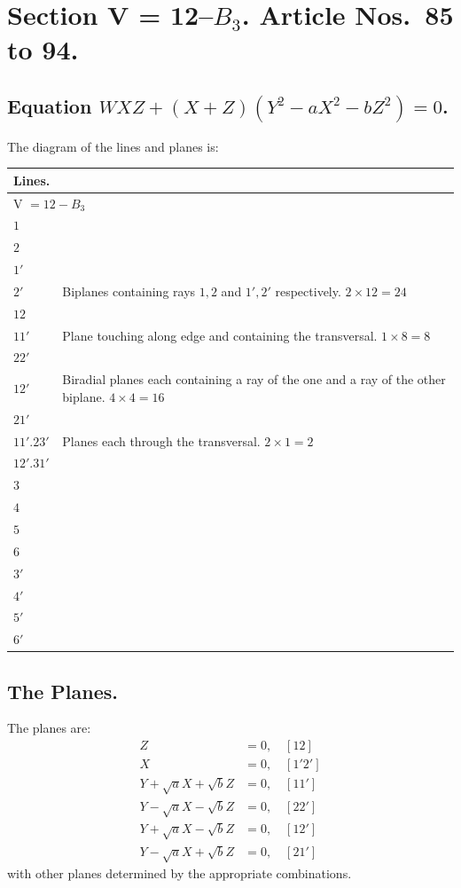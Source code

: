 \documentclass[11pt,a4paper]{article}
\begin{document}
\section*{Section V = 12--$B_3$. \quad Article Nos.~85 to 94.}

\setcounter{section}{85}
\subsection*{Equation $WXZ + (X+Z)(Y^2 - aX^2 - bZ^2) = 0$.}

The diagram of the lines and planes is:

\begin{center}
\begin{tabular}{ll}
\textbf{Lines.} & \\
\midrule
\multicolumn{2}{l}{V $= 12 - B_3$} \\
$1$ & \\
$2$ & \\
$1'$ & \\
$2'$ & Biplanes containing rays $1, 2$ and $1', 2'$ respectively. $2 \times 12 = 24$ \\
$12$ & \\
$11'$ & Plane touching along edge and containing the transversal. $1 \times 8 = 8$ \\
$22'$ & \\
$12'$ & Biradial planes each containing a ray of the one and a ray of the other biplane. $4 \times 4 = 16$ \\
$21'$ & \\
$11'.23'$ & Planes each through the transversal. $2 \times 1 = 2$ \\
$12'.31'$ & \\
$3$ & \\
$4$ & \\
$5$ & \\
$6$ & \\
$3'$ & \\
$4'$ & \\
$5'$ & \\
$6'$ &
\end{tabular}
\end{center}

\subsection*{The Planes.}

The planes are:
\begin{align*}
Z &= 0, \quad [12] \\
X &= 0, \quad [1'2'] \\
Y + \sqrt{a}X + \sqrt{b}Z &= 0, \quad [11'] \\
Y - \sqrt{a}X - \sqrt{b}Z &= 0, \quad [22'] \\
Y + \sqrt{a}X - \sqrt{b}Z &= 0, \quad [12'] \\
Y - \sqrt{a}X + \sqrt{b}Z &= 0, \quad [21']
\end{align*}
with other planes determined by the appropriate combinations.
\end{document}
